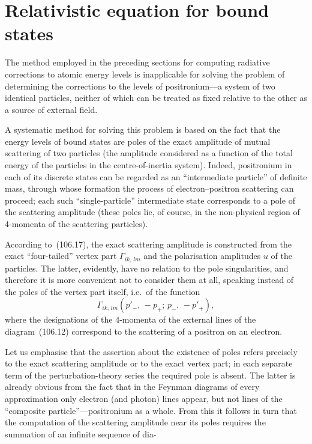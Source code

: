 
\section{Relativistic equation for bound states}


The method employed in the preceding sections for computing radiative corrections to atomic energy levels is inapplicable for solving the problem of determining the corrections to the levels of positronium---a system of two identical particles, neither of which can be treated as fixed relative to the other as a source of external field.

A systematic method for solving this problem is based on the fact that the energy levels of bound states are poles of the exact amplitude of mutual scattering of two particles (the amplitude considered as a function of the total energy of the particles in the centre-of-inertia system). Indeed, positronium in each of its discrete states can be regarded as an ``intermediate particle'' of definite mass, through whose formation the process of electron--positron scattering can proceed; each such ``single-particle'' intermediate state corresponds to a pole of the scattering amplitude (these poles lie, of course, in the non-physical region of 4-momenta of the scattering particles).

According to~(106.17), the exact scattering amplitude is constructed from the exact ``four-tailed'' vertex part $\Gamma_{ik,\,lm}$ and the polarisation amplitudes $u$ of the particles. The latter, evidently, have no relation to the pole singularities, and therefore it is more convenient not to consider them at all, speaking instead of the poles of the vertex part itself, i.e.\ of the function
\begin{equation}
\Gamma_{ik,\,lm}(p'_-,\,-p_+;\,p_-,\,-p'_+),
\label{eq:125.1}
\end{equation}
where the designations of the 4-momenta of the external lines of the diagram~(106.12) correspond to the scattering of a positron on an electron.

Let us emphasise that the assertion about the existence of poles refers precisely to the exact scattering amplitude or to the exact vertex part; in each separate term of the perturbation-theory series the required pole is absent. The latter is already obvious from the fact that in the Feynman diagrams of every approximation only electron (and photon) lines appear, but not lines of the ``composite particle''---positronium as a whole. From this it follows in turn that the computation of the scattering amplitude near its poles requires the summation of an infinite sequence of dia-

